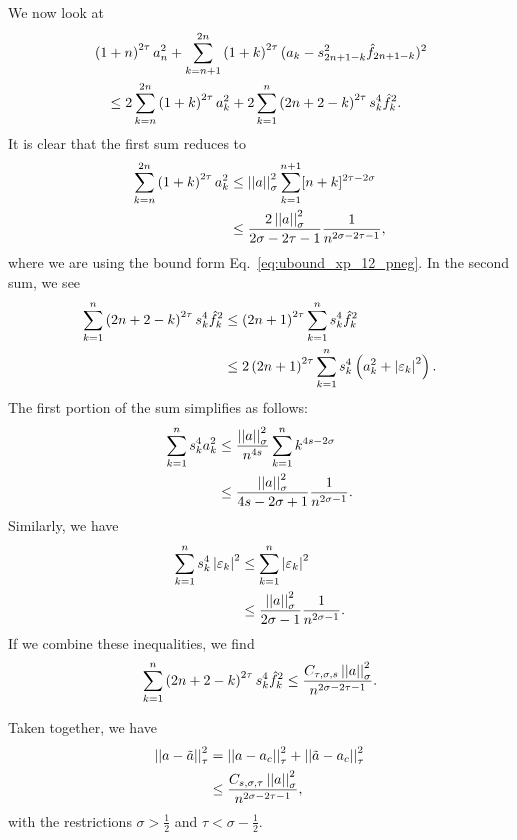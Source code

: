 We now look at
%
\begin{align}
    &\left( 1+n \right)^{2\tau}a_{n}^{2}
        + \sum_{k=n+1}^{2n}\left( 1+k \right)^{2\tau}(a_{k}
                -s_{2n+1-k}^{2}\hat{f}_{2n+1-k})^{2} \nonumber\\
    &\quad\le 2\sum_{k=n}^{2n}\left( 1+k \right)^{2\tau}a_{k}^{2}
        + 2\sum_{k=1}^{n}\left( 2n+2-k \right)^{2\tau}s_{k}^{4}\hat{f}_{k}^{2}.
\end{align}
%
It is clear that the first sum reduces to
%
\begin{align}
    \sum_{k=n}^{2n}\left( 1+k \right)^{2\tau}a_{k}^{2}
        &\le \left| \left| a \right| \right|_{\sigma}^{2}\sum_{k=1}^{n+1}[n+k]^{2\tau-2\sigma}
        \nonumber\\
    &\le \frac{2\left| \left| a \right| \right|_{\sigma}^{2}}{2\sigma-2\tau-1}\frac{1}{
        n^{2\sigma-2\tau-1}},
\end{align}
%
where we are using the bound form Eq.~\eqref{eq:ubound_xp_12_pneg}.
In the second sum, we see
%
\begin{align}
    \sum_{k=1}^{n}\left( 2n+2-k \right)^{2\tau}s_{k}^{4}\hat{f}_{k}^{2}
        &\le \left( 2n+1 \right)^{2\tau}\sum_{k=1}^{n}s_{k}^{4}\hat{f}_{k}^{2}
        \nonumber\\
    &\le 2\left( 2n+1 \right)^{2\tau}\sum_{k=1}^{n}s_{k}^{4}\left( 
        a_{k}^{2}+\left| \varepsilon_{k} \right|^{2} \right).
\end{align}
%
The first portion of the sum simplifies as follows:
%
\begin{align}
    \sum_{k=1}^{n}s_{k}^{4}a_{k}^{2} &\le \frac{\left| \left| a \right| \right|_{\sigma}^{2}}{n^{4s}}
        \sum_{k=1}^{n}k^{4s-2\sigma} \nonumber\\
    &\le \frac{\left| \left| a \right| \right|_{\sigma}^{2}}{4s-2\sigma+1}\frac{1}{n^{2\sigma-1}}.
\end{align}
%
Similarly, we have
%
\begin{align}
    \sum_{k=1}^{n}s_{k}^{4}\left| \varepsilon_{k} \right|^{2}
        &\le \sum_{k=1}^{n}\left| \varepsilon_{k} \right|^{2} \nonumber\\
    &\le \frac{\left| \left| a \right| \right|_{\sigma}^{2}}{2\sigma-1}\frac{1}{n^{2\sigma-1}}.
\end{align}
%
If we combine these inequalities, we find
%
\begin{equation}
    \sum_{k=1}^{n}\left( 2n+2-k \right)^{2\tau}s_{k}^{4}\hat{f}_{k}^{2}
        \le \frac{C_{\tau,\sigma,s}\left| \left| a \right| \right|_{\sigma}^{2}}{n^{2\sigma-2\tau-1}}.
\end{equation}

Taken together, we have
%
\begin{align}
    \left| \left| a-\tilde{a} \right| \right|_{\tau}^{2} &= \left| \left| a-a_{c} \right| \right|_{\tau}^{2}
        + \left| \left| \tilde{a}-a_{c} \right| \right|_{\tau}^{2} \nonumber\\
    &\le \frac{C_{s,\sigma,\tau}\left| \left| a \right| \right|_{\sigma}^{2}}{n^{2\sigma-2\tau-1}},
\end{align}
%
with the restrictions $\sigma>\frac{1}{2}$ and $\tau<\sigma-\frac{1}{2}$.

